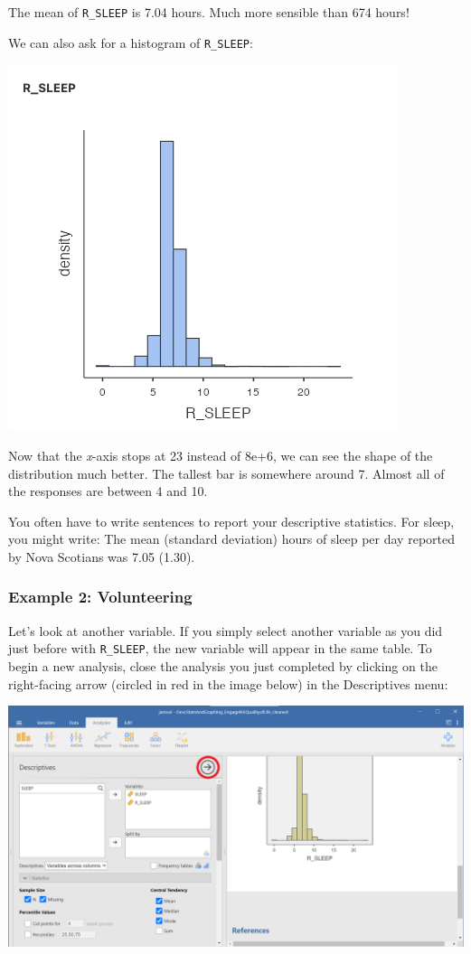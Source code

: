 \documentclass[
]{book}
\begin{document}
The mean of \texttt{R\_SLEEP} is 7.04 hours. Much more sensible than 674 hours!

We can also ask for a histogram of \texttt{R\_SLEEP}:

\includegraphics{img/r_sleephistogram.png}

Now that the \emph{x}-axis stops at 23 instead of 8e+6, we can see the shape of the distribution much better. The tallest bar is somewhere around 7. Almost all of the responses are between 4 and 10.

You often have to write sentences to report your descriptive statistics. For sleep, you might write: The mean (standard deviation) hours of sleep per day reported by Nova Scotians was 7.05 (1.30).

\hypertarget{example-2-volunteering}{%
\subsubsection{Example 2: Volunteering}\label{example-2-volunteering}}

Let's look at another variable. If you simply select another variable as you did just before with \texttt{R\_SLEEP}, the new variable will appear in the same table. To begin a new analysis, close the analysis you just completed by clicking on the right-facing arrow (circled in red in the image below) in the Descriptives menu:

\includegraphics{img/CloseAnalysesBeforeNewOnes.png}
\end{document}
